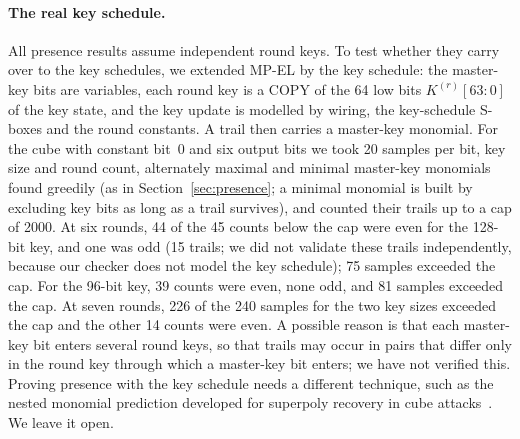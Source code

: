 \documentclass[11pt,a4paper]{article}
\theoremstyle{definition}
\theoremstyle{remark}
\newcommand{\MPEL}{\textsf{MP-EL}}
\begin{document}
\paragraph{The real key schedule.} All presence results assume independent round keys. To test whether they carry over to the key schedules, we extended \MPEL{} by the key schedule: the master-key bits are variables, each round key is a COPY of the 64 low bits $K^{(r)}[63{:}0]$ of the key state, and the key update is modelled by wiring, the key-schedule S-boxes and the round constants. A trail then carries a master-key monomial. For the cube with constant bit~0 and six output bits we took 20 samples per bit, key size and round count, alternately maximal and minimal master-key monomials found greedily (as in Section~\ref{sec:presence}; a minimal monomial is built by excluding key bits as long as a trail survives), and counted their trails up to a cap of 2000. At six rounds, 44 of the 45 counts below the cap were even for the 128-bit key, and one was odd (15 trails; we did not validate these trails independently, because our checker does not model the key schedule); 75 samples exceeded the cap. For the 96-bit key, 39 counts were even, none odd, and 81 samples exceeded the cap. At seven rounds, 226 of the 240 samples for the two key sizes exceeded the cap and the other 14 counts were even. A possible reason is that each master-key bit enters several round keys, so that trails may occur in pairs that differ only in the round key through which a master-key bit enters; we have not verified this. Proving presence with the key schedule needs a different technique, such as the nested monomial prediction developed for superpoly recovery in cube attacks~\cite{hu2021nested}. We leave it open.
\end{document}

